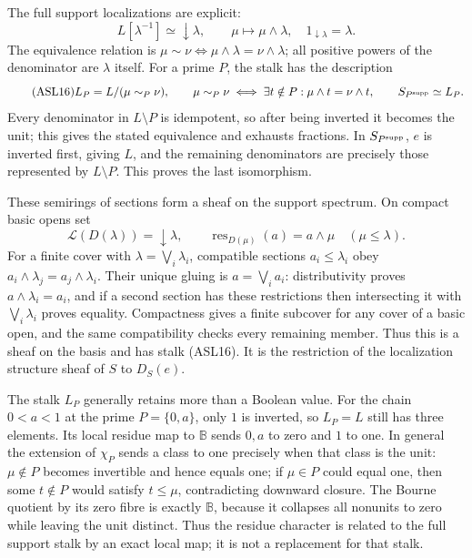 The full support localizations are explicit:
\begin{equation}\tag{ASL15}
 L[\lambda^{-1}]\simeq\downarrow\lambda,
 \qquad \mu\longmapsto\mu\wedge\lambda,
 \quad 1_{\downarrow\lambda}=\lambda.
\end{equation}
The equivalence relation is
$\mu\sim\nu\iff\mu\wedge\lambda=\nu\wedge\lambda$;
all positive powers of the denominator are $\lambda$ itself.
For a prime $P$, the stalk has the description
\begin{equation}\tag{ASL16}
 L_P=L/(\mu\sim_P\nu),\qquad
 \mu\sim_P\nu\iff
   \exists t\notin P:\mu\wedge t=\nu\wedge t,
 \qquad S_{P^{\rm supp}}\simeq L_P.
\end{equation}
Every denominator in $L\setminus P$ is idempotent, so after being
inverted it becomes the unit; this gives the stated equivalence and
exhausts fractions. In $S_{P^{\rm supp}}$, $e$ is inverted first,
giving $L$, and the remaining denominators are precisely those
represented by $L\setminus P$. This proves the last isomorphism.

These semirings of sections form a sheaf on the
support spectrum. On compact basic opens set
\begin{equation}\tag{ASL17}
 \mathcal L(D(\lambda))=\downarrow\lambda,
 \qquad
 \operatorname{res}_{D(\mu)}(a)=a\wedge\mu
                   \quad(\mu\le\lambda).
\end{equation}
For a finite cover with $\lambda=\bigvee_i\lambda_i$, compatible
sections $a_i\le\lambda_i$ obey
$a_i\wedge\lambda_j=a_j\wedge\lambda_i$. Their unique gluing is
$a=\bigvee_i a_i$: distributivity proves
$a\wedge\lambda_i=a_i$, and if a second section has these restrictions
then intersecting it with $\bigvee_i\lambda_i$ proves equality.
Compactness gives a finite subcover for any cover of a basic open,
and the same compatibility checks every remaining member. Thus this
is a sheaf on the basis and has stalk (ASL16). It is the restriction
of the localization structure sheaf of $S$ to $D_S(e)$.

The stalk $L_P$ generally retains more than a Boolean value. For the
chain $0<a<1$ at the prime $P=\{0,a\}$, only $1$ is inverted, so
$L_P=L$ still has three elements. Its local residue map to
$\mathbb B$ sends $0,a$ to zero and $1$ to one. In general the
extension of $\chi_P$ sends a class to one precisely when that class
is the unit: $\mu\notin P$ becomes invertible and hence equals one;
if $\mu\in P$ could equal one, then some $t\notin P$ would satisfy
$t\le\mu$, contradicting downward closure. The Bourne quotient
by its zero fibre is exactly $\mathbb B$, because it collapses all
nonunits to zero while leaving the unit distinct. Thus the residue
character is related to the full support stalk by an exact local
map; it is not a replacement for that stalk.

